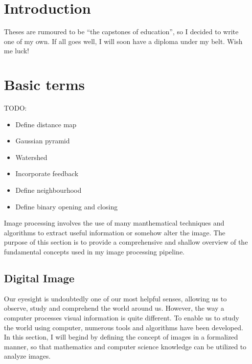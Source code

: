 \documentclass[
  digital,     %
  oneside,     %
  nosansbold,  %
  nocolorbold, %
  lof,         %
  lot,         %
]{fithesis4}
\begin{document}
\chapter*{Introduction}

Theses are rumoured to be \enquote{the capstones of education}, so
I decided to write one of my own. If all goes well, I will soon
have a diploma under my belt. Wish me luck!

\chapter{Basic terms}

TODO:
\begin{itemize}
    \item{Define distance map}
    \item{Gaussian pyramid}
    \item{Watershed}
    \item{Incorporate feedback}
    \item{Define neighbourhood}
    \item{Define binary opening and closing}
\end{itemize}

Image processing involves the use of many manthematical techniques and
algorithms to extract useful information or somehow alter the image. The purpose
of this section is to provide a comprehensive and shallow overview of the
fundamental concepts used in my image processing pipeline.

\section{Digital Image}
Our eyesight is undoubtedly one of our most helpful senses, allowing us to
observe, study and comprehend the world around us. However, the way a computer
processes visual information is quite different. To enable us to study the world
using computer, numerous tools and algorithms have been developed. In this
section, I will begind by defining the concept of images in a formalized manner,
so that mathematics and computer science knowledge can be utilized to analyze
images.
\end{document}
